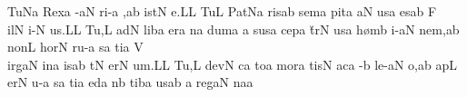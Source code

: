 \spatium
\divisiofinalis
\spatium
\sgn Tu{}\pes Na\egn
\spatium
\sgn Rex\punctum a\egn
\spatium
{}-\clivis aN\egn
\sgn ri-\punctum a\egn
\sgn {}{\ae},\pes ab\egn
\spatium
{}i{st}\bivirga N\egn
\sgn {}e.\punctum L\augmentum L\egn
\spatium
\divisiofinalis
\spatium
\sgn Tu{}\punctum L\egn
\spatium
\sgn Pat\pes Na\egn
\sgn ris\punctum a\augmentum b\egn
\spatium
\divisiominima
\spatium
\sgn sem\punctum a\egn
\sgn pit\punctum a\egn
{}\clivis aN\egn
\sgn {}us\punctum a\egn
\spatium
\sgn {}es\pes ab\egn
\spatium
\sgn F{\\i}l\punctum N\egn
\sgn {}i-\punctum N\egn
\sgn {}u{s.}\punctum L\augmentum L\egn
\spatium
\divisiofinalis
\spatium
\sgn Tu{,}\punctum L\egn
\spatium
\sgn {}ad\punctum N\egn
\spatium
\sgn lib\punctum a\egn
\sgn {}er\punctum a\egn
\sgn {}{\a}n\punctum a\egn
\sgn dum\punctum a\egn
\spatium
\custos a
\lineaproxima
\sgn sus\punctum a\egn
\sgn cep\punctum a\egn
\sgn t{\u}r\punctum N\egn
\sgn {}us\punctum a\egn
\spatium
\sgn h{\o}m\punctum b\egn
\sgn {}i-\clivis aN\egn
\sgn ne{m,}\punctum a\augmentum b\egn
\spatium
\divisiominima
\spatium
\sgn non\punctum L\egn
\spatium
\sgn hor\punctum N\egn
\sgn ru-\punctum a\egn
\sgn {}{\\i}s\punctum a\egn
\sgn ti{}\punctum a\egn
\spatium
\sgn V{\\i}{rg}\clivis aN\egn
\sgn {}in\punctum a\egn
\sgn {}is\pes ab\egn
\spatium
\sgn {}{\u}t\punctum N\egn
\sgn {}er\punctum N\egn
\sgn {}u{m.}\punctum L\augmentum L\egn
\spatium
\divisiofinalis
\spatium
\sgn Tu{,}\punctum L\egn
\spatium
\sgn dev\punctum N\egn
\sgn {}{\\i}c\punctum a\egn
\sgn to{}\punctum a\egn
\spatium
\sgn mor\punctum a\egn
\sgn tis\punctum N\egn
\spatium
\sgn {}ac\punctum a\egn
\sgn {}{\u}-\punctum b\egn
\sgn le-\clivis aN\egn
\sgn {}o,\punctum a\augmentum b\egn
\spatium
\divisiominor
\spatium
\sgn {}ap\punctum L\egn
\sgn {}er\punctum N\egn
\sgn {}u-\punctum a\egn
\sgn {}{\\i}s\punctum a\egn
\sgn ti{}\punctum a\egn
\spatium
{}ed\punctum a\egn
\sgn {}{\e}n\punctum b\egn
\sgn tib\punctum a\egn
\sgn {}us\punctum a\augmentum b\egn
\spatium
\divisiominima
\spatium
\custos a
\lineaproxima
\sgn reg\cephalicus aN\egn
\sgn na{}\punctum a\egn
